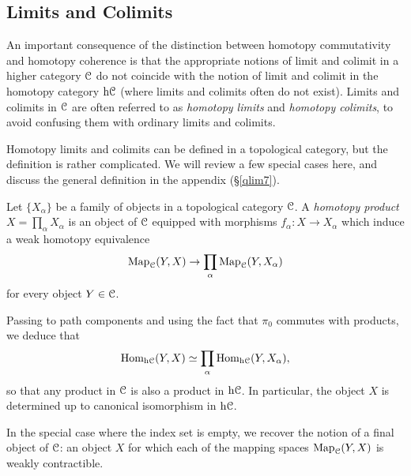 \subsection{Limits and Colimits}\label{limitcolimit}
\begin{1.2.13 Limits and colimits}
An important consequence of the distinction between homotopy
commutativity and homotopy coherence is that the appropriate
notions of limit and colimit in a higher category
$\operatorname{\mathcal{C}}$ do not coincide with the notion of limit and colimit in the homotopy category $\rm{h} \it{\operatorname{\mathcal{C}}}$ (where limits and colimits often do
not exist). Limits and colimits in
$\operatorname{\mathcal{C}}$ are often referred to as {\it homotopy limits} and
{\it homotopy colimits}, to avoid confusing them with ordinary limits
and colimits.

Homotopy limits and
colimits can be defined in a topological category, but the
definition is rather complicated. We will review a few special cases here, and discuss the general definition in the appendix (\S \ref{qlim7}).

\begin{example}\label{examprod}
Let $\{ X_{\alpha} \}$ be a family of objects in a topological
category $\operatorname{\mathcal{C}}$. A {\it homotopy product} $X = \prod_{\alpha}
X_{\alpha}$ is an object of $\operatorname{\mathcal{C}}$ equipped with morphisms
$f_{\alpha}: X \rightarrow X_{\alpha}$ which induce a weak
homotopy equivalence
$$ \operatorname{{Map}}_{\operatorname{\mathcal{C}}}(Y,X) \rightarrow \prod_{\alpha} \operatorname{{Map}}_{\operatorname{\mathcal{C}}}(Y,
X_{\alpha})$$ for every object $Y \in \operatorname{\mathcal{C}}$.

Passing to path components and using the fact that $\pi_0$
commutes with products, we deduce that $$\operatorname{Hom}_{\rm{h} \it{\operatorname{\mathcal{C}}}}(Y,X) \simeq
\prod_{\alpha} \operatorname{Hom}_{\rm{h} \it{\operatorname{\mathcal{C}}}}(Y, X_{\alpha}),$$ so that any product in $\operatorname{\mathcal{C}}$ is
also a product in $\rm{h} \it{\operatorname{\mathcal{C}}}$. In particular, the object $X$ is
determined up to canonical isomorphism in $\rm{h} \it{\operatorname{\mathcal{C}}}$.

In the special case where the index set is empty, we recover the
notion of a final object of $\operatorname{\mathcal{C}}$: an object $X$ for which each
of the mapping spaces $\operatorname{{Map}}_{\operatorname{\mathcal{C}}}(Y,X)$ is weakly contractible.
\end{example}


\end{1.2.13 Limits and colimits}

